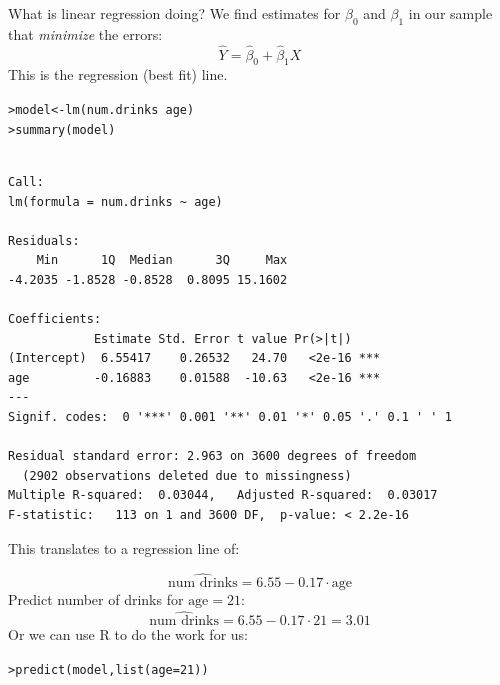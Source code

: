 \documentclass{beamer}\usepackage[]{graphicx}\usepackage[]{color}
\makeatletter
\newcommand{\hlnum}[1]{\textcolor[rgb]{0.824,0.412,0.118}{#1}}%
\newcommand{\hlopt}[1]{\textcolor[rgb]{1,0.894,0.769}{#1}}%
\newcommand{\hlstd}[1]{\textcolor[rgb]{1,0.894,0.769}{#1}}%
\newcommand{\hlkwb}[1]{\textcolor[rgb]{0.804,0.776,0.451}{#1}}%
\newcommand{\hlkwc}[1]{\textcolor[rgb]{0.78,0.941,0.545}{#1}}%
\newcommand{\hlkwd}[1]{\textcolor[rgb]{1,0.78,0.769}{#1}}%
\newenvironment{kframe}{%
 \def\at@end@of@kframe{}%
 \ifinner\ifhmode%
  \def\at@end@of@kframe{\end{minipage}}%
  \begin{minipage}{\columnwidth}%
 \fi\fi%
 \def\FrameCommand##1{\hskip\@totalleftmargin \hskip-\fboxsep
 \colorbox{shadecolor}{##1}\hskip-\fboxsep
     \hskip-\linewidth \hskip-\@totalleftmargin \hskip\columnwidth}%
 \MakeFramed {\advance\hsize-\width
   \@totalleftmargin\z@ \linewidth\hsize
   \@setminipage}}%
 {\par\unskip\endMakeFramed%
 \at@end@of@kframe}
\newenvironment{knitrout}{}{} %
\makeatother
\begin{document}
\begin{darkframes}
\begin{frame}{What is linear regression doing?}
      We find estimates for $\beta_0$ and $\beta_1$ in our sample that \emph{minimize} the errors:
      \[
        \hat Y = \hat\beta_0 + \hat\beta_1 X
      \]
      This is the regression (best fit) line.
    \end{frame}

    \begin{frame}[fragile]
      \fontsize{9}{9}\selectfont
\begin{knitrout}
\begin{kframe}
\begin{alltt}
\hlstd{> }\hlstd{model} \hlkwb{<-} \hlkwd{lm}\hlstd{(num.drinks} \hlopt{~} \hlstd{age)}
\hlstd{> }\hlkwd{summary}\hlstd{(model)}
\end{alltt}
\begin{verbatim}

Call:
lm(formula = num.drinks ~ age)

Residuals:
    Min      1Q  Median      3Q     Max 
-4.2035 -1.8528 -0.8528  0.8095 15.1602 

Coefficients:
            Estimate Std. Error t value Pr(>|t|)    
(Intercept)  6.55417    0.26532   24.70   <2e-16 ***
age         -0.16883    0.01588  -10.63   <2e-16 ***
---
Signif. codes:  0 '***' 0.001 '**' 0.01 '*' 0.05 '.' 0.1 ' ' 1

Residual standard error: 2.963 on 3600 degrees of freedom
  (2902 observations deleted due to missingness)
Multiple R-squared:  0.03044,	Adjusted R-squared:  0.03017 
F-statistic:   113 on 1 and 3600 DF,  p-value: < 2.2e-16
\end{verbatim}
\end{kframe}
\end{knitrout}
      \lc
    \end{frame}

    \begin{frame}[fragile]
      This translates to a regression line of:

      \[
        \widehat{\text{num drinks}} = 6.55 - 0.17 \cdot\text{age}
      \]
      \pause
      Predict number of drinks for $\text{age}=21$:
      \[
        \widehat{\text{num drinks}}
        = 6.55 - 0.17 \cdot 21
        = 3.01
      \]
      Or we can use R to do the work for us:
\begin{knitrout}
\begin{kframe}
\begin{alltt}
\hlstd{> }\hlkwd{predict}\hlstd{(model,} \hlkwd{list}\hlstd{(}\hlkwc{age}\hlstd{=}\hlnum{21}\hlstd{))}
\end{alltt}
\end{kframe}
\end{knitrout}
      \lc
    \end{frame}


\end{darkframes}
\end{document}
